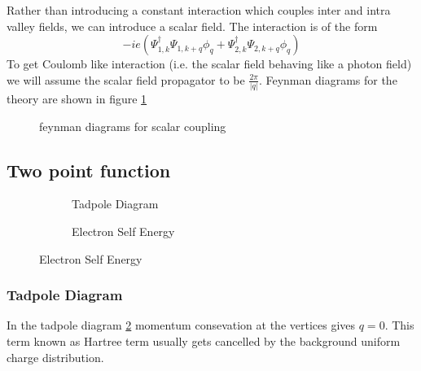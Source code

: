\documentclass[a4paper,crop=false]{standalone}
\begin{document}
    Rather than introducing a constant interaction which couples inter and intra valley fields, we can introduce a scalar field. The interaction is of the form
    \begin{equation}
        -ie(\Psi_{1,k}^{\dagger}\Psi_{1,k+q}\phi_{q} + \Psi_{2,k}^{\dagger}\Psi_{2,k+q}\phi_{q})
    \end{equation}
    To get Coulomb like interaction (i.e. the scalar field behaving like a photon field) we will assume the scalar field propagator to be $\frac{2\pi}{|q|}$. Feynman diagrams for the theory are shown in figure \ref{fig:feynman_scalar}
    \begin{figure}[h]
        \centering
        
        \caption{feynman diagrams for scalar coupling}
        \label{fig:feynman_scalar}
    \end{figure}
    \subsection{Two point function}
        \begin{figure}[h]
            \centering
            \begin{subfigure}[t]{0.49\textwidth}
                
                \caption{Tadpole Diagram}
                \label{tadpole}
            \end{subfigure}
            \begin{subfigure}[t]{0.49\textwidth}
                
                \caption{Electron Self Energy}
                \label{electron_self_energy}
            \end{subfigure}
        \end{figure}
        \subsubsection*{Tadpole Diagram}
            In the tadpole diagram \ref{tadpole} momentum consevation at the vertices gives $q=0$. This term known as Hartree term usually gets cancelled by the background uniform charge distribution.
\end{document}
